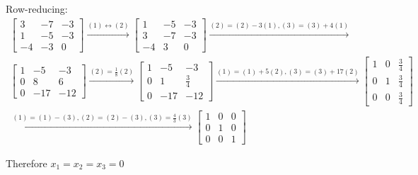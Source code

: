 \documentclass[a4paper, 11pt]{article}
\begin{document}
\begin{solution}
    Row-reducing:
    \begin{multline*}
        \left[\begin{array}{ccc}
                3  & -7 & -3 \\
                1  & -5 & -3 \\
                -4 & -3 & 0
            \end{array}\right] \xrightarrow{(1) \leftrightarrow (2)}
        \left[\begin{array}{ccc}
                1  & -5 & -3 \\
                3  & -7 & -3 \\
                -4 & 3  & 0
            \end{array}\right] \xrightarrow{(2) = (2)-3(1), (3) = (3) + 4(1)}
        \\
        \left[\begin{array}{ccc}
                1 & -5  & -3  \\
                0 & 8   & 6   \\
                0 & -17 & -12
            \end{array}\right]
        \xrightarrow{(2) = \frac{1}{8} (2)}
        \left[\begin{array}{ccc}
                1 & -5  & -3          \\
                0 & 1   & \frac{3}{4} \\
                0 & -17 & -12
            \end{array}\right]\xrightarrow{(1) = (1) + 5(2), (3) = (3) + 17(2)}
        \left[\begin{array}{ccc}
                1 & 0 & \frac{3}{4} \\
                0 & 1 & \frac{3}{4} \\
                0 & 0 & \frac{3}{4}
            \end{array}\right]
        \\
        \xrightarrow{(1) = (1)-(3), (2) = (2) -(3), (3) = \frac{4}{3} (3)}
        \left[\begin{array}{ccc}
                1 & 0 & 0 \\
                0 & 1 & 0 \\
                0 & 0 & 1
            \end{array}\right]
    \end{multline*}

    Therefore \(x_1 = x_2 = x_3 = 0\)
\end{solution}
\end{document}
